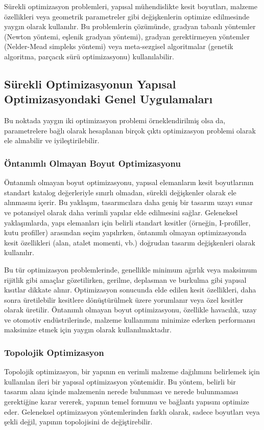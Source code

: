 Sürekli optimizasyon problemleri, yapısal mühendislikte kesit boyutları, malzeme özellikleri veya geometrik parametreler gibi değişkenlerin optimize edilmesinde yaygın olarak kullanılır. Bu problemlerin çözümünde, gradyan tabanlı yöntemler (Newton yöntemi, eşlenik gradyan yöntemi), gradyan gerektirmeyen yöntemler (Nelder-Mead simpleks yöntemi) veya meta-sezgisel algoritmalar (genetik algoritma, parçacık sürü optimizasyonu) kullanılabilir.

\subsection{Sürekli Optimizasyonun Yapısal Optimizasyondaki Genel Uygulamaları}
Bu noktada yaygın iki optimizasyon problemi örneklendirilmiş olsa da, parametrelere bağlı olarak hesaplanan birçok çıktı optimizasyon problemi olarak ele alınabilir ve iyileştirilebilir.

\subsubsection{Öntanımlı Olmayan Boyut Optimizasyonu}
Öntanımlı olmayan boyut optimizasyonu, yapısal elemanların kesit boyutlarının standart katalog değerleriyle sınırlı olmadan, sürekli değişkenler olarak ele alınmasını içerir. Bu yaklaşım, tasarımcılara daha geniş bir tasarım uzayı sunar ve potansiyel olarak daha verimli yapılar elde edilmesini sağlar. Geleneksel yaklaşımlarda, yapı elemanları için belirli standart kesitler (örneğin, I-profiller, kutu profiller) arasından seçim yapılırken, öntanımlı olmayan optimizasyonda kesit özellikleri (alan, atalet momenti, vb.) doğrudan tasarım değişkenleri olarak kullanılır.

Bu tür optimizasyon problemlerinde, genellikle minimum ağırlık veya maksimum rijitlik gibi amaçlar gözetilirken, gerilme, deplasman ve burkulma gibi yapısal kısıtlar dikkate alınır. Optimizasyon sonucunda elde edilen kesit özellikleri, daha sonra üretilebilir kesitlere dönüştürülmek üzere yorumlanır veya özel kesitler olarak üretilir. Öntanımlı olmayan boyut optimizasyonu, özellikle havacılık, uzay ve otomotiv endüstrilerinde, malzeme kullanımını minimize ederken performansı maksimize etmek için yaygın olarak kullanılmaktadır.


\subsubsection{Topolojik Optimizasyon}
Topolojik optimizasyon, bir yapının en verimli malzeme dağılımını belirlemek için kullanılan ileri bir yapısal optimizasyon yöntemidir. Bu yöntem, belirli bir tasarım alanı içinde malzemenin nerede bulunması ve nerede bulunmaması gerektiğine karar vererek, yapının temel formunu ve bağlantı yapısını optimize eder. Geleneksel optimizasyon yöntemlerinden farklı olarak, sadece boyutları veya şekli değil, yapının topolojisini de değiştirebilir.

